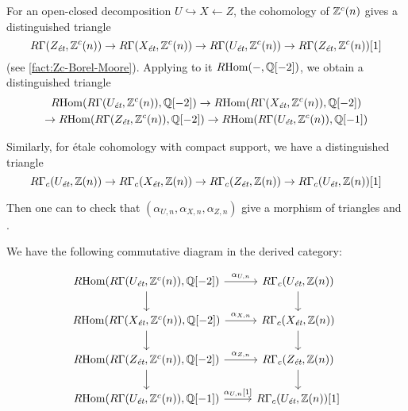 For an open-closed decomposition $U \hookrightarrow X \leftarrow Z$, the
cohomology of $\mathbb{Z}^c (n)$ gives a distinguished triangle
\[ R\Gamma (Z_\text{\it ét}, \mathbb{Z}^c (n)) \to
  R\Gamma (X_\text{\it ét}, \mathbb{Z}^c (n)) \to
  R\Gamma (U_\text{\it ét}, \mathbb{Z}^c (n)) \to
  R\Gamma (Z_\text{\it ét}, \mathbb{Z}^c (n)) [1] \]
(see \ref{fact:Zc-Borel-Moore}). Applying to it $R\!\operatorname{Hom} (-, \mathbb{Q} [-2])$, we obtain
a distinguished triangle
\begin{multline}
  \label{eqn:U-X-Z-triangle-for-RHom-Q}
  R\!\operatorname{Hom} (R\Gamma (U_\text{\it ét}, \mathbb{Z}^c (n)), \mathbb{Q} [-2]) \to
  R\!\operatorname{Hom} (R\Gamma (X_\text{\it ét}, \mathbb{Z}^c (n)), \mathbb{Q} [-2]) \\
  \to R\!\operatorname{Hom} (R\Gamma (Z_\text{\it ét}, \mathbb{Z}^c (n)), \mathbb{Q} [-2]) \to
  R\!\operatorname{Hom} (R\Gamma (U_\text{\it ét}, \mathbb{Z}^c (n)), \mathbb{Q} [-1])
\end{multline}

Similarly, for étale cohomology with compact support, we have a distinguished
triangle
\begin{equation}
  \label{eqn:U-X-Z-triangle-for-RGammac}
  R\Gamma_c (U_\text{\it ét}, \mathbb{Z} (n)) \to
  R\Gamma_c (X_\text{\it ét}, \mathbb{Z} (n)) \to
  R\Gamma_c (Z_\text{\it ét}, \mathbb{Z} (n)) \to
  R\Gamma_c (U_\text{\it ét}, \mathbb{Z} (n)) [1]
\end{equation}

Then one can to check that $(\alpha_{U,n}, \alpha_{X,n}, \alpha_{Z,n})$ give a
morphism of triangles  and
.

\begin{lemma}
  We have the following commutative diagram in the derived category:

  \begin{equation}
    \label{eqn:triangle-morphism-alphaUn-alphaXn-alphaZn}
    \begin{tikzcd}
      \RHom (R\Gamma (U_\text{\it ét}, \ZZ^c (n)), \QQ [-2]) \ar{d}\ar{r}{\alpha_{U,n}} & R\Gamma_c (U_\text{\it ét}, \ZZ (n)) \ar{d} \\
      \RHom (R\Gamma (X_\text{\it ét}, \ZZ^c (n)), \QQ [-2]) \ar{d}\ar{r}{\alpha_{X,n}} & R\Gamma_c (X_\text{\it ét}, \ZZ (n)) \ar{d} \\
      \RHom (R\Gamma (Z_\text{\it ét}, \ZZ^c (n)), \QQ [-2]) \ar{d}\ar{r}{\alpha_{Z,n}} & R\Gamma_c (Z_\text{\it ét}, \ZZ (n)) \ar{d} \\
      \RHom (R\Gamma (U_\text{\it ét}, \ZZ^c (n)), \QQ [-1]) \ar{r}{\alpha_{U,n} [1]} & R\Gamma_c (U_\text{\it ét}, \ZZ (n)) [1]
    \end{tikzcd}
  \end{equation}
\end{lemma}

